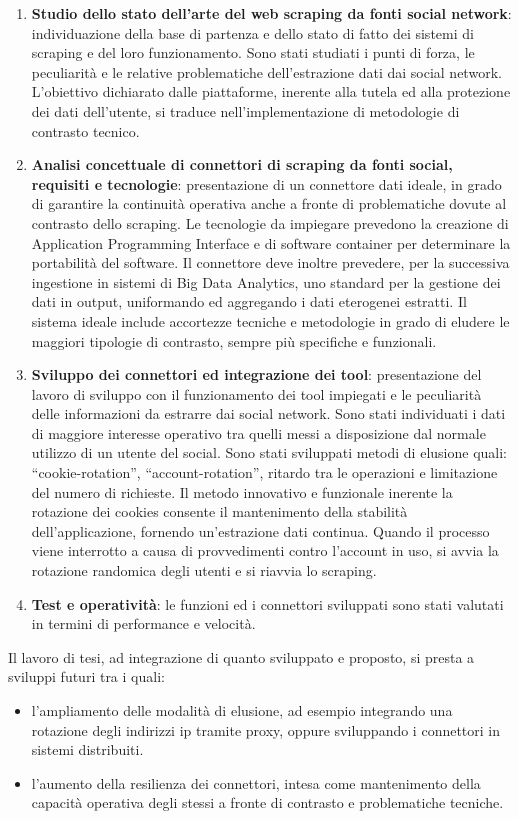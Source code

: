 \documentclass{article}
\begin{document}
\begin{enumerate}
    \item \textbf{Studio dello stato dell'arte del web scraping da fonti social network}: individuazione della base di partenza e dello stato di fatto dei sistemi di scraping e del loro funzionamento. Sono stati studiati i punti di forza, le peculiarit\`a e le relative problematiche dell'estrazione dati dai social network. L'obiettivo dichiarato dalle piattaforme, inerente alla tutela ed alla protezione dei dati dell'utente, si traduce nell'implementazione di metodologie di contrasto tecnico.
    \item \textbf{Analisi concettuale di connettori di scraping da fonti social, requisiti e tecnologie}: presentazione di un connettore dati ideale, in grado di garantire la continuit\`a operativa anche a fronte di problematiche dovute al contrasto dello scraping. Le tecnologie da impiegare prevedono la creazione di Application Programming Interface e di software container per determinare la portabilit\`a del software. Il connettore deve inoltre prevedere, per la successiva ingestione in sistemi di Big Data Analytics, uno standard per la gestione dei dati in output, uniformando ed aggregando i dati eterogenei estratti. Il sistema ideale include accortezze tecniche e metodologie in grado di eludere le maggiori tipologie di contrasto, sempre pi\`u specifiche e funzionali.
    \item \textbf{Sviluppo dei connettori ed integrazione dei tool}: presentazione del lavoro di sviluppo con il funzionamento dei tool impiegati e le peculiarit\`a delle informazioni da estrarre dai social network. Sono stati individuati i dati di maggiore interesse operativo tra quelli messi a disposizione dal normale utilizzo di un utente del social. Sono stati sviluppati metodi di elusione quali: ``cookie-rotation'', ``account-rotation'', ritardo tra le operazioni e limitazione del numero di richieste. Il metodo innovativo e funzionale inerente la rotazione dei cookies consente il mantenimento della stabilit\`a dell'applicazione, fornendo un'estrazione dati continua. Quando il processo viene interrotto a causa di provvedimenti contro l'account in uso, si avvia la rotazione randomica degli utenti e si riavvia lo scraping. 
    
    \item \textbf{Test e operativit\`a}: le funzioni ed i connettori sviluppati sono stati valutati in termini di performance e velocit\`a. 
\end{enumerate}
\newpage
Il lavoro di tesi, ad integrazione di quanto sviluppato e proposto, si presta a sviluppi futuri tra i quali:
\begin{itemize}
    \item l'ampliamento delle modalit\`a di elusione, ad esempio integrando una rotazione degli indirizzi ip tramite proxy, oppure sviluppando i connettori in sistemi distribuiti.
    \item l'aumento della resilienza dei connettori, intesa come mantenimento della capacit\`a operativa degli stessi a fronte di contrasto e problematiche tecniche.
\end{itemize} 
\end{document}

